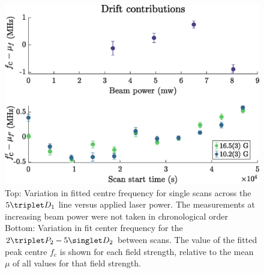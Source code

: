 

	


\begin{figure}
  \begin{minipage}[t]{0.6\textwidth}
  \vspace{0pt}
  \includegraphics[width=\textwidth]{fig/spectroscopy/power-drift-combined}
  \end{minipage}\hfill
  \begin{minipage}[t]{0.38\textwidth}
  \vspace{0pt}
\caption{Top: Variation in fitted centre frequency for single scans across the $5\triplet D_1$ line versus applied laser power.
	The measurements at increasing beam power were not taken in chronological order Bottom: Variation in fit center frequency for the $2\triplet P_2 - 5\singlet D_2$ between scans.
	The value of the fitted peak centre $f_\textrm{c}$ is shown for each field strength, relative to the mean $\mu$ of all values for that field strength.}
\label{fig:power_drift_combined}
  \end{minipage}
\end{figure}


